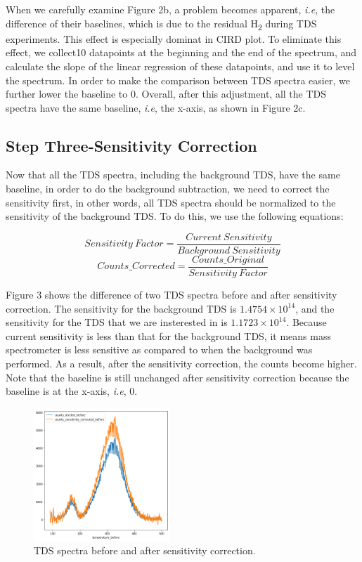 \documentclass{article}
\begin{document}
When we carefully examine Figure 2b, a problem becomes apparent, \textit{i.e},
the difference of their baselines, which is due to the residual
H\textsubscript{2} during TDS experiments. This effect is especially dominat in
CIRD plot. To eliminate this effect, we collect10 datapoints at the beginning
and the end of the spectrum, and calculate the slope of the linear regression
of these datapoints, and use it to level the spectrum. In order to make the
comparison between TDS spectra easier, we further lower the baseline to 0.
Overall, after this adjustment, all the TDS spectra have the same baseline,
\textit{i.e}, the x-axis, as shown in Figure 2c.

\subsection{Step Three-Sensitivity Correction}
Now that all the TDS spectra, including the background TDS, have the same
baseline, in order to do the background subtraction, we need to correct the
sensitivity first, in other words, all TDS spectra should be normalized to the
sensitivity of the background TDS. To do this, we use the following equations:

$$Sensitivity\ Factor=\frac{Current\ Sensitivity}{Background\ Sensitivity}$$
$$Counts\_Corrected=\frac{Counts\_Original}{Sensitivity\ Factor}$$

Figure 3 shows the difference of two TDS spectra before and after sensitivity
correction. The sensitivity for the background TDS is $1.4754\times 10^{14}$,
and the sensitivity for the TDS that we are insterested in is $1.1723\times
10^{14}$. Because current sensitivity is less than that for the background TDS,
it means mass spectrometer is less sensitive as compared to when the background
was performed. As a result, after the sensitivity correction, the counts
become higher. Note that the baseline is still unchanged after sensitivity
correction because the baseline is at the x-axis, \textit{i.e}, 0.

\begin{figure}[h]
\centering
\includegraphics[width=0.6\linewidth, height=5cm]{sensitivity_correction.png}
\caption{TDS spectra before and after sensitivity correction.}
\label{fig:image3}
\end{figure}
\end{document}
